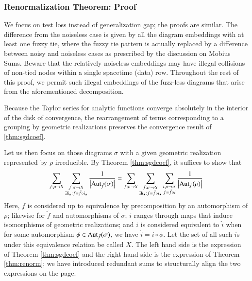 \documentclass{article}
\theoremstyle{plain}
\theoremstyle{definition}
\newcommand{\Aut}{\text{\textnormal{Aut}}}
\newcommand{\wabs}[1]{\left|#1\right|}
\begin{document}
        \subsubsection*{Renormalization Theorem: Proof}
            We focus on test loss instead of generalization gap; the proofs are
            similar. The
            difference from the noiseless case is given by all the diagram
            embeddings with at least one fuzzy tie, where the fuzzy tie pattern
            is actually replaced by a difference between noisy and noiseless
            cases as prescribed by the discussion on Mobius Sums.
            Beware that the relatively noiseless embeddings may have illegal
            collisions of non-tied nodes within a single spacetime (data) row.
            Throughout the rest of this proof, we permit such illegal
            embeddings of the fuzz-less diagrams that arise from the
            aforementioned decomposition.  

            Because the Taylor series for analytic functions converge
            absolutely in the interior of the disk of convergence, the
            rearrangement of terms corresponding to a grouping by geometric
            realizations preserves the convergence result of \ref{thm:sgdcoef}.  

            Let us then focus on those diagrams $\sigma$ with a given geometric
            realization represented by $\rho$ irreducible.  By Theorem
            \ref{thm:sgdcoef}, it suffices to show that
            \begin{equation} \label{eq:hard}
                \sum_{f:\rho\to S}
                \sum_{\substack{
                    \tilde f:\sigma\to S \\
                    \exists i_\star: f=\tilde f \circ i_\star
                }}
                \frac{1}{\wabs{\Aut_{\tilde f}(\sigma)}}
                =
                \sum_{f:\rho\to S}
                \sum_{\substack{
                    \tilde f:\sigma\to S \\
                    \exists i_\star: f=\tilde f \circ i_\star
                }}
                \sum_{\substack{
                    i:\rho\to\sigma \\
                    f = \tilde f \circ i
                }}
                \frac{1}{\wabs{\Aut_{f}(\rho)}}
            \end{equation}
            Here, $f$ is considered up to equivalence by precomposition by an
            automorphism of $\rho$; likewise for $\tilde f$ and automorphisms
            of $\sigma$; $i$ ranges through maps that induce isomorphisms of
            geometric realizations; and $i$ is considered equivalent to $\hat
            i$ when for some automorphism $\phi \in \Aut_{\tilde f}(\sigma)$,
            we have $\hat i = i \circ \phi$.  Let the set of all such $i$s
            under this equivalence relation be called $X$.  The left hand side
            is the expression of Theorem \ref{thm:sgdcoef} and the right hand
            side is the expression of Theorem \ref{thm:renorm}; we have
            introduced redundant sums to structurally align the two expressions
            on the page.
\end{document}
